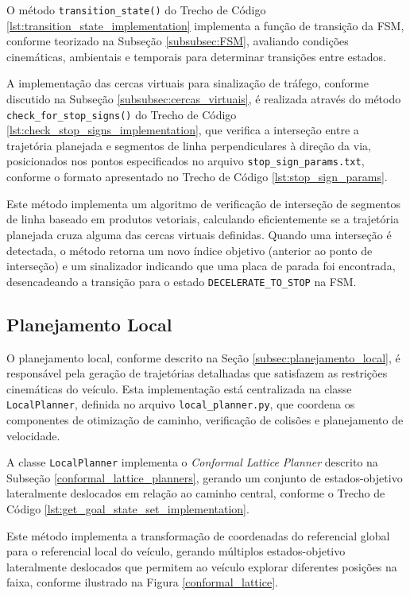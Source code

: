 O método \texttt{transition\_state()} do Trecho de Código \ref{lst:transition_state_implementation} implementa a função de transição da FSM, conforme teorizado na Subseção \ref{subsubsec:FSM}, avaliando condições cinemáticas, ambientais e temporais para determinar transições entre estados.

A implementação das cercas virtuais para sinalização de tráfego, conforme discutido na Subseção \ref{subsubsec:cercas_virtuais}, é realizada através do método \texttt{check\_for\_stop\_signs()} do Trecho de Código \ref{lst:check_stop_signs_implementation}, que verifica a interseção entre a trajetória planejada e segmentos de linha perpendiculares à direção da via, posicionados nos pontos especificados no arquivo \texttt{stop\_sign\_params.txt}, conforme o formato apresentado no Trecho de Código \ref{lst:stop_sign_params}.

Este método implementa um algoritmo de verificação de interseção de segmentos de linha baseado em produtos vetoriais, calculando eficientemente se a trajetória planejada cruza alguma das cercas virtuais definidas. Quando uma interseção é detectada, o método retorna um novo índice objetivo (anterior ao ponto de interseção) e um sinalizador indicando que uma placa de parada foi encontrada, desencadeando a transição para o estado \texttt{DECELERATE\_TO\_STOP} na FSM.

\subsection{Planejamento Local} \label{subsec:implementacao_local}

O planejamento local, conforme descrito na Seção \ref{subsec:planejamento_local}, é responsável pela geração de trajetórias detalhadas que satisfazem as restrições cinemáticas do veículo. Esta implementação está centralizada na classe \texttt{LocalPlanner}, definida no arquivo \texttt{local\_planner.py}, que coordena os componentes de otimização de caminho, verificação de colisões e planejamento de velocidade.

A classe \texttt{LocalPlanner} implementa o \textit{Conformal Lattice Planner} descrito na Subseção \ref{conformal_lattice_planners}, gerando um conjunto de estados-objetivo lateralmente deslocados em relação ao caminho central, conforme o Trecho de Código \ref{lst:get_goal_state_set_implementation}.

Este método implementa a transformação de coordenadas do referencial global para o referencial local do veículo, gerando múltiplos estados-objetivo lateralmente deslocados que permitem ao veículo explorar diferentes posições na faixa, conforme ilustrado na Figura \ref{conformal_lattice}.

